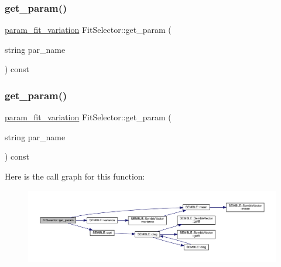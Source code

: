 \mbox{\label{classFitSelector_aa01f927232345b58d1f3bda5631300a1}} 
\subsubsection{\texorpdfstring{get\_param()}{get\_param()}\hspace{0.1cm}{\footnotesize\ttfamily [1/2]}}
{\footnotesize\ttfamily \mbox{\hyperlink{structparam__fit__variation}{param\+\_\+fit\+\_\+variation}} Fit\+Selector\+::get\+\_\+param (\begin{DoxyParamCaption}\item[{string}]{par\+\_\+name }\end{DoxyParamCaption}) const}

\mbox{\label{classFitSelector_aa01f927232345b58d1f3bda5631300a1}} 
\subsubsection{\texorpdfstring{get\_param()}{get\_param()}\hspace{0.1cm}{\footnotesize\ttfamily [2/2]}}
{\footnotesize\ttfamily \mbox{\hyperlink{structparam__fit__variation}{param\+\_\+fit\+\_\+variation}} Fit\+Selector\+::get\+\_\+param (\begin{DoxyParamCaption}\item[{string}]{par\+\_\+name }\end{DoxyParamCaption}) const}

Here is the call graph for this function\+:
\nopagebreak
\begin{figure}[H]
\begin{center}
\leavevmode
\includegraphics[width=350pt]{d0/d5e/classFitSelector_aa01f927232345b58d1f3bda5631300a1_cgraph}
\end{center}
\end{figure}
\mbox{\label{classFitSelector_adaeea09e76449a7210518347f40a80d5}} 
